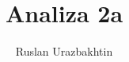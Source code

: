 \documentclass[11pt, a4paper]{article}
\begin{document}
\title{Analiza 2a}
\author{Ruslan Urazbakhtin}
\maketitle

\newpage
\tableofcontents
\newpage



\newpage


\newpage


\newpage

\end{document}
